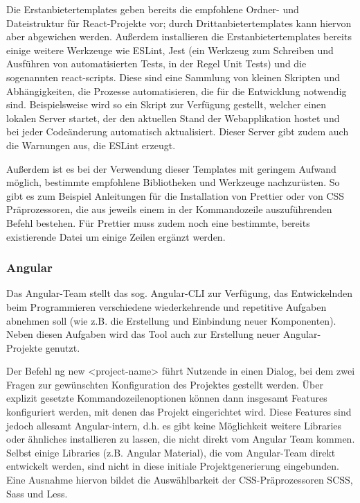 Die Erstanbietertemplates geben bereits die empfohlene Ordner- und Dateistruktur für React-Projekte vor; durch Drittanbietertemplates kann hiervon aber abgewichen werden. Außerdem installieren die Erstanbietertemplates bereits einige weitere Werkzeuge wie ESLint, Jest (ein Werkzeug zum Schreiben und Ausführen von automatisierten Tests, in der Regel Unit Tests) und die sogenannten react-scripts. Diese sind eine Sammlung von kleinen Skripten und Abhängigkeiten, die Prozesse automatisieren, die für die Entwicklung notwendig sind. Beispielsweise wird so ein Skript zur Verfügung gestellt, welcher einen lokalen Server startet, der den aktuellen Stand der Webapplikation hostet und bei jeder Codeänderung automatisch aktualisiert. Dieser Server gibt zudem auch die Warnungen aus, die ESLint erzeugt.

Außerdem ist es bei der Verwendung dieser Templates mit geringem Aufwand möglich, bestimmte empfohlene Bibliotheken und Werkzeuge nachzurüsten. So gibt es zum Beispiel Anleitungen für die Installation von Prettier oder von CSS Präprozessoren, die aus jeweils einem in der Kommandozeile auszuführenden Befehl bestehen. Für Prettier muss zudem noch eine bestimmte, bereits existierende Datei um einige Zeilen ergänzt werden.

\subsubsection{Angular}
Das Angular-Team stellt das sog. Angular-CLI zur Verfügung, das Entwickelnden beim Programmieren verschiedene wiederkehrende und repetitive Aufgaben abnehmen soll (wie z.B. die Erstellung und Einbindung neuer Komponenten). Neben diesen Aufgaben wird das Tool auch zur Erstellung neuer Angular-Projekte genutzt.

Der Befehl ng new <project-name> führt Nutzende in einen Dialog, bei dem zwei Fragen zur gewünschten Konfiguration des Projektes gestellt werden. Über explizit gesetzte Kommandozeilenoptionen können dann insgesamt Features konfiguriert werden, mit denen das Projekt eingerichtet wird. Diese Features sind jedoch allesamt Angular-intern, d.h. es gibt keine Möglichkeit weitere Libraries oder ähnliches installieren zu lassen, die nicht direkt vom Angular Team kommen. Selbst einige Libraries (z.B. Angular Material), die vom Angular-Team direkt entwickelt werden, sind nicht in diese initiale Projektgenerierung eingebunden. Eine Ausnahme hiervon bildet die Auswählbarkeit der CSS-Präprozessoren SCSS, Sass und Less.

